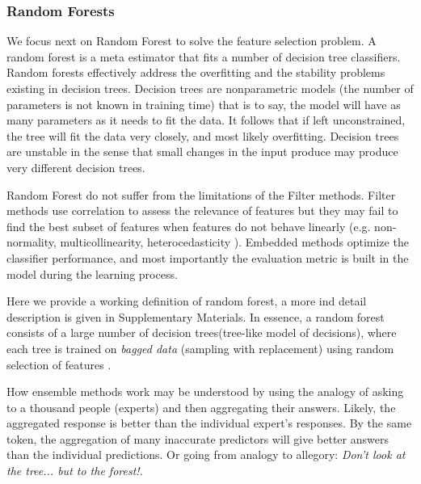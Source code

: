 \documentclass[preprint,12pt]{elsarticle}
\begin{document}
\subsubsection{Random Forests}
We focus next on Random Forest to solve the feature selection problem. 
A random forest is a meta estimator that fits a number of decision tree classifiers.   
Random forests effectively address the overfitting and the stability problems existing in decision trees. Decision trees are nonparametric models (the number of parameters is not known in training time) that is to say, the model will have as many parameters as it needs to fit the data. It follows that if left unconstrained, the tree will fit the data very closely, and most likely overfitting. Decision trees are unstable in the sense that small changes in the input produce may produce very different decision trees.

Random Forest do not suffer from the limitations of the Filter methods. Filter methods use correlation to assess the relevance of features but they may fail to find the best subset of features when features do not behave linearly (e.g. non-normality, multicollinearity, heterocedasticity \cite{ratkowsky1990handbook}). 
Embedded methods optimize the classifier performance, and most importantly the evaluation metric is built in the model during the learning process.

Here we provide a working definition of random forest, a more ind detail description is given in Supplementary Materials. In essence, a random forest consists of a large number of decision trees(tree-like model of decisions), where each tree is trained on \emph{bagged data} (sampling with replacement) using random selection of features \cite{trevor2009elements}. 

How ensemble methods work may be understood by using the analogy of asking to a thousand people (experts) and then aggregating their answers. Likely, the aggregated response is better than the individual expert’s responses. By the same token, the aggregation of many inaccurate predictors will give better answers than the individual predictions. Or going from analogy to allegory: \emph{Don’t look at the tree... but to the forest!. }
\end{document}
